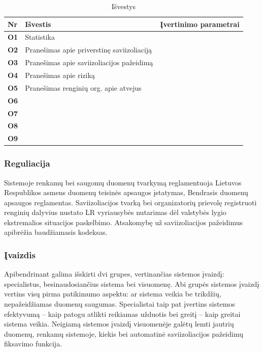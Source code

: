 \documentclass{VUMIFPSkursinis}
\begin{document}
\begin{center}
\begin{longtable}{|L{0.5cm}|L{4cm}|L{3cm}|}

\caption{Išvestys}
\label{table:output} \\ \hline
			
			\textbf{Nr} & \textbf{Išvestis}                          & Įvertinimo parametrai \\ \hline
			\textbf{O1} & Statistika                                 &                       \\ \hline
			\textbf{O2} & Pranešimas apie priverstinę saviizoliaciją &                       \\ \hline
			\textbf{O3} & Pranešimas apie saviizoliacijos pažeidimą  &                       \\ \hline
			\textbf{O4} & Pranešimas apie riziką                     &                       \\ \hline
			\textbf{O5} & Pranešimas renginių org. apie atvejus      &                       \\ \hline
			\textbf{O6} &                                            &                       \\ \hline
			\textbf{O7} &                                            &                       \\ \hline
			\textbf{O8} &                                            &                       \\ \hline
			\textbf{O9} &                                            &                       \\ \hline
\end{longtable}
\end{center}

\subsubsection{Reguliacija}\label{sec:versloReqRegulation}
Sistemoje renkamų bei saugomų duomenų tvarkymą reglamentuoja Lietuvos Respublikos asmens duomenų teisinės apsaugos įstatymas,
Bendrasis duomenų apsaugos reglamentas. Saviizoliacijos tvarką bei organizatorių prievolę registruoti renginių dalyvius nustato
LR vyriausybės nutarimas dėl valstybės lygio ekstremalios situacijos paskelbimo. Atsakomybę už saviizoliacijos pažeidimus
apibrėžia baudžiamasis kodeksas.

\subsubsection{Įvaizdis}\label{sec:versloReqWhyAssessment}
Apibendrinant galima išskirti dvi grupes, vertinančias sistemos įvaizdį: specialistus, besinaudosiančius sistema
bei visuomenę. Abi grupės sistemos įvaizdį vertins visų pirma patikimumo aspektu: ar sistema veikia be trikdžių,
nepažeidžiamas duomenų saugumas. Specialistai taip pat įvertins sistemos efektyvumą -- kaip patogu atlikti reikiamas
užduotis bei greitį -- kaip greitai sistema veikia. Neigiamą sistemos įvaizdį visuomenėje galėtų lemti jautrių duomenų,
renkamų sistemoje, kiekis bei automatinė saviizoliacijos pažeidimų fiksavimo funkcija.
\end{document}
